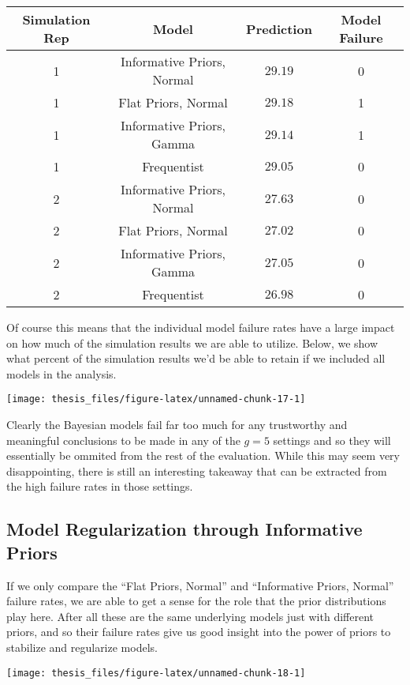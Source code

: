 \documentclass[12pt,twoside]{reedthesis}
\begin{document}
\captionsetup[table]{labelformat=empty,skip=1pt}
\begin{longtable}{cccc}
\toprule
Simulation Rep & Model & Prediction & Model Failure \\ 
\midrule
1 & Informative Priors, Normal & $29.19$ & 0 \\ 
1 & Flat Priors, Normal & $29.18$ & 1 \\ 
1 & Informative Priors, Gamma & $29.14$ & 1 \\ 
1 & Frequentist & $29.05$ & 0 \\ 
2 & Informative Priors, Normal & $27.63$ & 0 \\ 
2 & Flat Priors, Normal & $27.02$ & 0 \\ 
2 & Informative Priors, Gamma & $27.05$ & 0 \\ 
2 & Frequentist & $26.98$ & 0 \\ 
\bottomrule
\end{longtable}
Of course this means that the individual model failure rates have a large impact on how much of the simulation results we are able to utilize. Below, we show what percent of the simulation results we'd be able to retain if we included all models in the analysis.
\begin{center}\texttt{[image: thesis\_files/figure-latex/unnamed-chunk-17-1]} \end{center}

Clearly the Bayesian models fail far too much for any trustworthy and meaningful conclusions to be made in any of the \(g = 5\) settings and so they will essentially be ommited from the rest of the evaluation. While this may seem very disappointing, there is still an interesting takeaway that can be extracted from the high failure rates in those settings.

\hypertarget{model-regularization-through-informative-priors}{%
\subsection{Model Regularization through Informative Priors}\label{model-regularization-through-informative-priors}}

If we only compare the ``Flat Priors, Normal'' and ``Informative Priors, Normal'' failure rates, we are able to get a sense for the role that the prior distributions play here. After all these are the same underlying models just with different priors, and so their failure rates give us good insight into the power of priors to stabilize and regularize models.
\begin{center}\texttt{[image: thesis\_files/figure-latex/unnamed-chunk-18-1]} \end{center}
\end{document}
